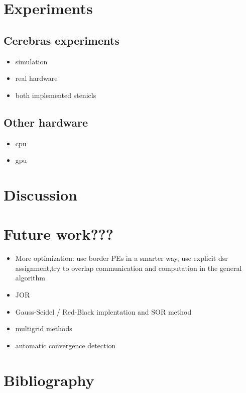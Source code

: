 \documentclass{article}
\begin{document}
\section{Experiments}
\subsection{Cerebras experiments}

\begin{itemize}
    \item simulation
    \item real hardware
    \item both implemented stenicls
\end{itemize}
\subsection{Other hardware}
\begin{itemize}
    \item cpu
    \item gpu
\end{itemize}
\section{Discussion}
\section{Future work???}
\begin{itemize}
    \item More optimization: use border PEs in a smarter way, use explicit dsr assignment,try to overlap communication and computation in the general algorithm
    \item JOR
    \item Gauss-Seidel / Red-Black implentation and SOR method
    \item multigrid methods
    \item automatic convergence detection
\end{itemize}

\section{Bibliography}
\end{document}
